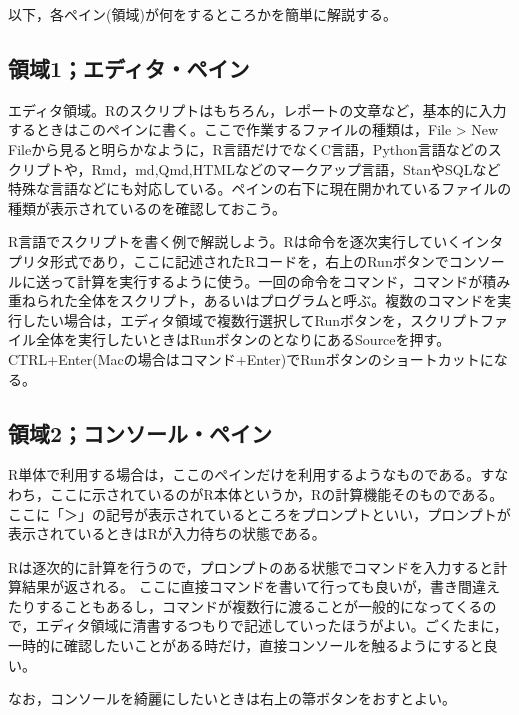 \documentclass[
  a4paper,
]{ltjsbook}
\begin{document}
以下，各ペイン(領域)が何をするところかを簡単に解説する。

\hypertarget{ux9818ux57df1ux30a8ux30c7ux30a3ux30bfux30daux30a4ux30f3-1}{%
\subsection{領域1；エディタ・ペイン}\label{ux9818ux57df1ux30a8ux30c7ux30a3ux30bfux30daux30a4ux30f3-1}}

エディタ領域。Rのスクリプトはもちろん，レポートの文章など，基本的に入力するときはこのペインに書く。ここで作業するファイルの種類は，File
\textgreater{} New
Fileから見ると明らかなように，R言語だけでなくC言語，Python言語などのスクリプトや，Rmd，md,Qmd,HTMLなどのマークアップ言語，StanやSQLなど特殊な言語などにも対応している。ペインの右下に現在開かれているファイルの種類が表示されているのを確認しておこう。

R言語でスクリプトを書く例で解説しよう。Rは命令を逐次実行していくインタプリタ形式であり，ここに記述されたRコードを，右上のRunボタンでコンソールに送って計算を実行するように使う。一回の命令をコマンド，コマンドが積み重ねられた全体をスクリプト，あるいはプログラムと呼ぶ。複数のコマンドを実行したい場合は，エディタ領域で複数行選択してRunボタンを，スクリプトファイル全体を実行したいときはRunボタンのとなりにあるSourceを押す。CTRL+Enter(Macの場合はコマンド+Enter)でRunボタンのショートカットになる。

\hypertarget{ux9818ux57df2ux30b3ux30f3ux30bdux30fcux30ebux30daux30a4ux30f3-1}{%
\subsection{領域2；コンソール・ペイン}\label{ux9818ux57df2ux30b3ux30f3ux30bdux30fcux30ebux30daux30a4ux30f3-1}}

R単体で利用する場合は，ここのペインだけを利用するようなものである。すなわち，ここに示されているのがR本体というか，Rの計算機能そのものである。ここに「＞」の記号が表示されているところをプロンプトといい，プロンプトが表示されているときはRが入力待ちの状態である。

Rは逐次的に計算を行うので，プロンプトのある状態でコマンドを入力すると計算結果が返される。
ここに直接コマンドを書いて行っても良いが，書き間違えたりすることもあるし，コマンドが複数行に渡ることが一般的になってくるので，エディタ領域に清書するつもりで記述していったほうがよい。ごくたまに，一時的に確認したいことがある時だけ，直接コンソールを触るようにすると良い。

なお，コンソールを綺麗にしたいときは右上の箒ボタンをおすとよい。
\end{document}

